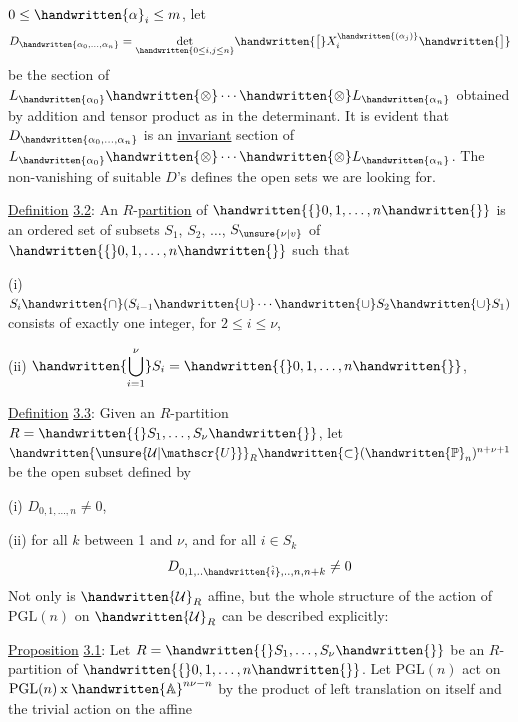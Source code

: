 $0\leq\handwritten{\alpha}_i\leq m$, let
\[
 D_{\handwritten{\alpha_0,\ldots,\alpha_n}}=\underset{\handwritten{0\leq i,j\leq n}}{\det}
 \handwritten{\bigl[}X_i^{\handwritten{(\alpha_j)}}\handwritten{\bigr]}
\]
be the section of $L_{\handwritten{\alpha_0}}\handwritten{\otimes}\cdots\handwritten{\otimes}L_{\handwritten{\alpha_n}}$ obtained by addition and tensor
product as in the determinant. It is evident that $D_{\handwritten{\alpha_0,\ldots,\alpha_n}}$ is an
\uline{invariant} section of $L_{\handwritten{\alpha_0}}\handwritten{\otimes}\cdots\handwritten{\otimes}L_{\handwritten{\alpha_n}}$. The non-vanishing of suitable
$D$'s defines the open sets we are looking for.

\uline{Definition} \uline{3.2}: An \uline{$R$}-\uline{partition} of $\handwritten{\{}0,1,\ldots,n\handwritten{\}}$ is an ordered set
of subsets $S_1$, $S_2$, $\ldots$, $S_{\unsure{\nu|v}}$ of $\handwritten{\{}0,1,\ldots,n\handwritten{\}}$ such that

(i) $S_i\handwritten{\cap}(S_{i-1}\handwritten{\cup}\cdots\handwritten{\cup}S_2\handwritten{\cup}S_1)$ consists of exactly one
integer, for $2\leq i\leq\nu$,

(ii) $\displaystyle\handwritten{\bigcup_{i=1}^{\nu}}S_i=\handwritten{\{}0,1,\ldots,n\handwritten{\}}$,

\uline{Definition} \uline{3.3}: Given an $R$-partition $R=\handwritten{\{}S_1,\ldots,S_\nu\handwritten{\}}$, let
$\handwritten{\unsure{\mathcal{U}|\mathscr{U}}}_R\handwritten{\subset}(\handwritten{\mathbb{P}}_n)^{n+\nu+1}$ be the open subset defined by

(i) $D_{0,1,\ldots,n}\ne 0$,

(ii) for all $k$ between 1 and $\nu$, and for all $i\in S_k$
\[
 D_{0,1,..\handwritten{\hat{i}},..,n,n+k}\ne 0
\]
Not only is $\handwritten{\mathcal{U}}_R$ affine, but the whole structure of the action
of $\mathrm{PGL}(n)$ on $\handwritten{\mathcal{U}}_R$ can be described explicitly:

\uline{Proposition} \uline{3.1}: Let $R=\handwritten{\{}S_1,\ldots,S_\nu\handwritten{\}}$ be an $R$-partition of
$\handwritten{\{}0,1,\ldots,n\handwritten{\}}$. Let $\mathrm{PGL}(n)$ act on $\mathrm{PGL}(n)\mathbin{\mathrm{x}}\handwritten{\mathbb{A}}^{n\nu-n}$ by the product
of left translation on itself and the trivial action on the affine


